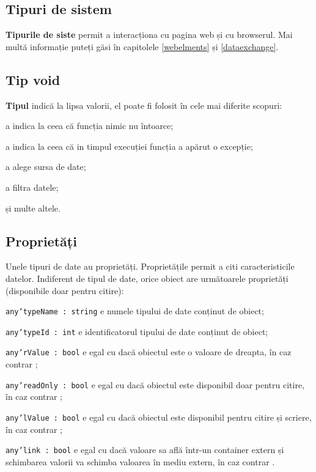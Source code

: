 \subsection{Tipuri de sistem}

{\bf Tipurile de siste} permit a interacționa cu pagina web și cu browserul. Mai multă informație puteți găsi în capitolele \ref{webelments} și \ref{dataexchange}.

\subsection{Tip {\color{lightblue} void}}

{\bf Tipul \void{}} indică la lipsa valorii, el poate fi folosit în cele mai diferite scopuri:

\begin{icItems}
\item
	a indica la ceea că funcția nimic nu întoarce;
\item
	a indica la ceea că in timpul execuției funcția a apărut o excepție;
\item
	a alege sursa de date;
\item
	a filtra datele;
\item
	și multe altele.
\end{icItems}


\subsection{Proprietăți}

Unele tipuri de date au proprietăți. Proprietățile permit a citi caracteristicile datelor. Indiferent de tipul de date, orice obiect are următoarele proprietăți (disponibile doar pentru citire):

\begin{icItems}
\item
	\texttt{any'typeName : string} e numele tipului de date conținut de obiect;
\item
	\texttt{any'typeId : int} e identificatorul tipului de date conținut de obiect;
\item
	\texttt{any'rValue : bool} e egal cu \true{} dacă obiectul este o valoare de dreapta, în caz contrar \false{};
\item
	\texttt{any'readOnly : bool} e egal cu \true{} dacă obiectul este disponibil doar pentru citire, în caz contrar \false{};
\item
	\texttt{any'lValue : bool} e egal cu \true{} dacă obiectul este disponibil pentru citire și scriere, în caz contrar \false{};
\item
	\texttt{any'link : bool} e egal cu \true{} dacă valoare sa află într-un container extern și schimbarea valorii va schimba valoarea în mediu extern, în caz contrar \false{}.
\end{icItems}

